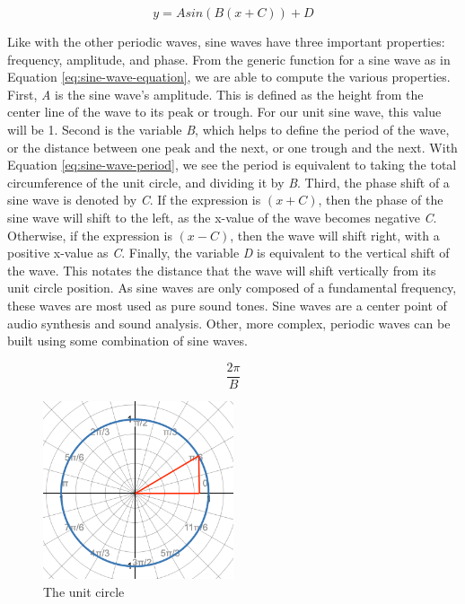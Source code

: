 \begin{equation}
	y = Asin(B(x + C)) + D
	\label{eq:sine-wave-equation}
\end{equation}

Like with the other periodic waves, sine waves have three important properties: frequency, amplitude, and phase. From the generic function for a sine wave as in Equation \ref{eq:sine-wave-equation}, we are able to compute the various properties. First, \textit{A} is the sine wave's amplitude. This is defined as the height from the center line of the wave to its peak or trough. For our unit sine wave, this value will be 1. Second is the variable \textit{B}, which helps to define the period of the wave, or the distance between one peak and the next, or one trough and the next. With Equation \ref{eq:sine-wave-period}, we see the period is equivalent to taking the total circumference of the unit circle, and dividing it by \textit{B}. Third, the phase shift of a sine wave is denoted by \textit{C}. If the expression is $(x + C)$, then the phase of the sine wave will shift to the left, as the x-value of the wave becomes negative \textit{C}. Otherwise, if the expression is $(x - C)$, then the wave will shift right, with a positive x-value as \textit{C}. Finally, the variable \textit{D} is equivalent to the vertical shift of the wave. This notates the distance that the wave will shift vertically from its unit circle position. As sine waves are only composed of a fundamental frequency, these waves are most used as pure sound tones. Sine waves are a center point of audio synthesis and sound analysis. Other, more complex, periodic waves can be built using some combination of sine waves. 

\begin{equation}
	\frac{2\pi}{B}
	\label{eq:sine-wave-period}
\end{equation}

\begin{figure}
	\centering
	\includegraphics[width=0.5\textwidth]{figures/unit-circle.png}
	\caption{The unit circle}
	\label{fig:unit-circle}
\end{figure}

